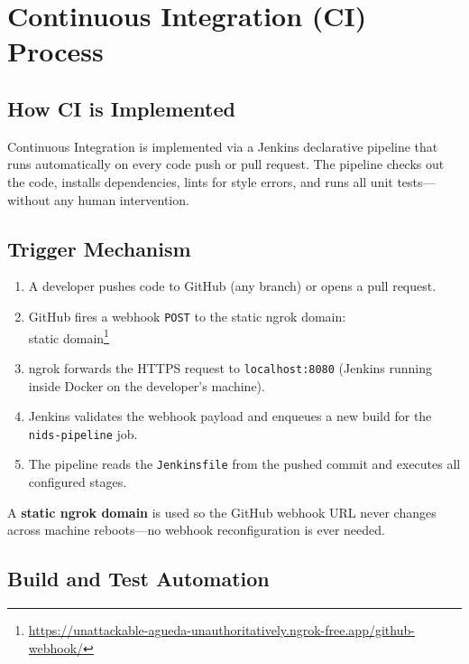 \documentclass[12pt,a4paper]{report}
\begin{document}
\chapter{Continuous Integration (CI) Process}

\section{How CI is Implemented}
Continuous Integration is implemented via a Jenkins declarative pipeline that
runs automatically on every code push or pull request.  The pipeline checks
out the code, installs dependencies, lints for style errors, and runs all
unit tests---without any human intervention.

\section{Trigger Mechanism}
\begin{enumerate}
  \item A developer pushes code to GitHub (any branch) or opens a pull
        request.
  \item GitHub fires a webhook \texttt{POST} to the static ngrok domain:\\
      \small static domain\footnote{\url{https://unattackable-agueda-unauthoritatively.ngrok-free.app/github-webhook/}}
  \item ngrok forwards the HTTPS request to \texttt{localhost:8080} (Jenkins
        running inside Docker on the developer's machine).
  \item Jenkins validates the webhook payload and enqueues a new build for
        the \texttt{nids-pipeline} job.
  \item The pipeline reads the \texttt{Jenkinsfile} from the pushed commit
        and executes all configured stages.
\end{enumerate}

A \textbf{static ngrok domain} is used so the GitHub webhook URL never changes
across machine reboots---no webhook reconfiguration is ever needed.

\section{Build and Test Automation}
\end{document}
